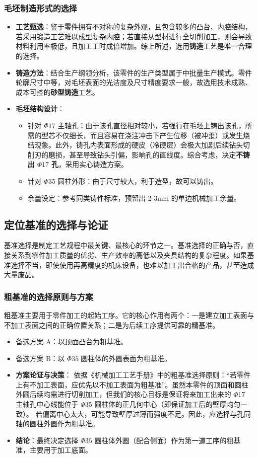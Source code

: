 \documentclass[withoutpreface,bwprint]{cumcmthesis}
\begin{document}
\subsubsection{毛坯制造形式的选择}
\begin{itemize}
    \item \textbf{工艺甄选}：鉴于零件拥有不对称的复杂外观，且包含较多的凸台、内腔结构，若采用锻造工艺难以成型复杂内腔；若直接从型材进行全切削加工，则会导致材料利用率极低，且加工工时成倍增加。综上所述，选用\textbf{铸造}工艺是唯一合理的选择。
    \item \textbf{铸造方法}：结合生产纲领分析，该零件的生产类型属于中批量生产模式。零件轮廓尺寸中等，对毛坯表面的光洁度及尺寸精度要求一般，故选用技术成熟、成本可控的\textbf{砂型铸造}工艺。
    \item \textbf{毛坯结构设计}：
    \begin{itemize}
        \item 针对 $\Phi17$ 主轴孔：由于该孔直径相对较小，若强行在毛坯上铸出该孔，所需的型芯不仅细长，而且容易在浇注冲击下产生位移（被冲歪）或发生烧结现象。此外，铸孔内表面形成的硬皮（冷硬层）会极大加剧后续钻头切削刃的磨损，甚至导致钻头引偏，影响孔的直线度。综合考虑，决定\textbf{不铸出 $\Phi17$ 孔}，采用实心铸造方案。
        \item 针对 $\Phi35$ 圆柱外形：由于尺寸较大，利于造型，故可以铸出。
        \item 余量设定：参考同类铸件标准，预留出 2-3mm 的单边机械加工余量。
    \end{itemize}
\end{itemize}

\subsection{定位基准的选择与论证}
基准选择是制定工艺规程中最关键、最核心的环节之一。基准选择的正确与否，直接关系到零件加工质量的优劣、生产效率的高低以及夹具结构的复杂程度。如果基准选择不当，即使使用再高精度的机床设备，也难以加工出合格的产品，甚至造成大量废品。

\subsubsection{粗基准的选择原则与方案}
粗基准主要用于零件加工的起始工序。它的核心作用有两个：一是建立加工表面与不加工表面之间的正确位置关系；二是为后续工序提供可靠的精基准。
\begin{itemize}
    \item 备选方案 A：以顶面凸台为粗基准。
    \item 备选方案 B：以 $\Phi35$ 圆柱体的外圆表面为粗基准。
    \item \textbf{方案论证与决策}：
    依据《机械加工工艺手册》中的粗基准选择原则：“若零件上有不加工表面，应优先以不加工表面为粗基准”。虽然本零件的顶面和圆柱外圆后续均需进行切削加工，但我们的核心目标是保证将来加工出来的 $\Phi17$ 主轴孔中心线能位于 $\Phi35$ 圆柱体的正几何中心（即保证加工后的壁厚均匀一致）。
    若偏离中心太大，可能导致壁厚过薄而强度不足。因此，应选择与孔同轴的圆柱外圆作为粗基准。
    \item \textbf{结论}：最终决定选择 $\Phi35$ 圆柱体外圆（配合侧面）作为第一道工序的粗基准，主要用于加工底面。
\end{itemize}
\end{document}
